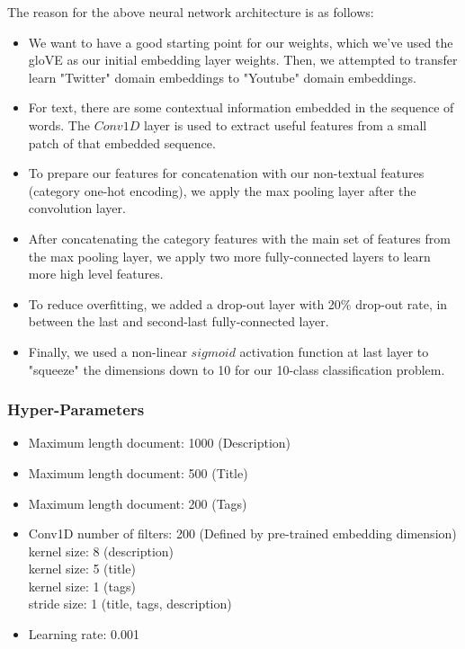 \documentclass[english]{article}
\begin{document}
\begin{enumerate}
    The reason for the above neural network architecture is as follows:
    \begin{itemize}
        \item We want to have a good starting point for our weights, which we've used the gloVE as our initial embedding layer weights. Then, we attempted to transfer learn "Twitter" domain embeddings to "Youtube" domain embeddings.
        \item For text, there are some contextual information embedded in the sequence of words. The $Conv1D$ layer is used to extract useful features from a small patch of that embedded sequence.
        \item To prepare our features for concatenation with our non-textual features (category one-hot encoding), we apply the max pooling layer after the convolution layer.
        \item After concatenating the category features with the main set of features from the max pooling layer, we apply two more fully-connected layers to learn more high level features.
        \item To reduce overfitting, we added a drop-out layer with 20\% drop-out rate, in between the last and second-last fully-connected layer.
        \item Finally, we used a non-linear $sigmoid$ activation function at last layer to "squeeze" the dimensions down to 10 for our 10-class classification problem.
    \end{itemize}

\end{enumerate}
\subsubsection{Hyper-Parameters}
\begin{itemize}
    \item Maximum length document: 1000 (Description)
    \item Maximum length document: 500 (Title)
    \item Maximum length document: 200 (Tags)
    \item Conv1D number of filters: 200 (Defined by pre-trained embedding dimension)\\
    kernel size: 8 (description)\\
    kernel size: 5 (title)\\
    kernel size: 1 (tags)\\
    stride size: 1 (title, tags, description)
    \item Learning rate: 0.001
\end{itemize}
\end{document}
